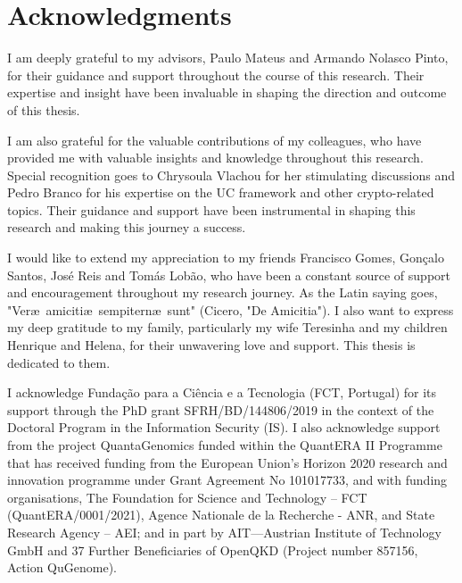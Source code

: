 

\chapter*{Acknowledgments}

I am deeply grateful to my advisors, Paulo Mateus and Armando Nolasco Pinto, for their guidance and support throughout the course of this research. Their expertise and insight have been invaluable in shaping the direction and outcome of this thesis.

I am also grateful for the valuable contributions of my colleagues, who have provided me with valuable insights and knowledge throughout this research. Special recognition goes to Chrysoula Vlachou for her stimulating discussions and Pedro Branco for his expertise on the UC framework and other crypto-related topics. Their guidance and support have been instrumental in shaping this research and making this journey a success.

I would like to extend my appreciation to my friends Francisco Gomes, Gonçalo Santos, José Reis and Tomás Lobão, who have been a constant source of support and encouragement throughout my research journey. As the Latin saying goes, "Ver\ae\ amiciti\ae\ sempitern\ae\ sunt" (Cicero, "De Amicitia"). I also want to express my deep gratitude to my family, particularly my wife Teresinha and my children Henrique and Helena, for their unwavering love and support. This thesis is dedicated to them.

\vfill
\begin{center}\begin{footnotesize}
I acknowledge Funda\c{c}\~{a}o para a Ci\^{e}ncia e a Tecnologia (FCT, Portugal) for its support through the PhD grant SFRH/BD/144806/2019 in the context of the Doctoral Program in the Information Security (IS). I also acknowledge support from the project QuantaGenomics funded within the QuantERA II Programme that has received funding from the European Union’s Horizon 2020 research and innovation programme under Grant Agreement No 101017733, and with funding organisations, The Foundation for Science and Technology – FCT (QuantERA/0001/2021), Agence Nationale de la Recherche - ANR, and State Research Agency – AEI; and in part by AIT—Austrian Institute of Technology GmbH and 37 Further Beneficiaries of OpenQKD (Project number 857156, Action QuGenome).

\end{footnotesize}
\end{center}

